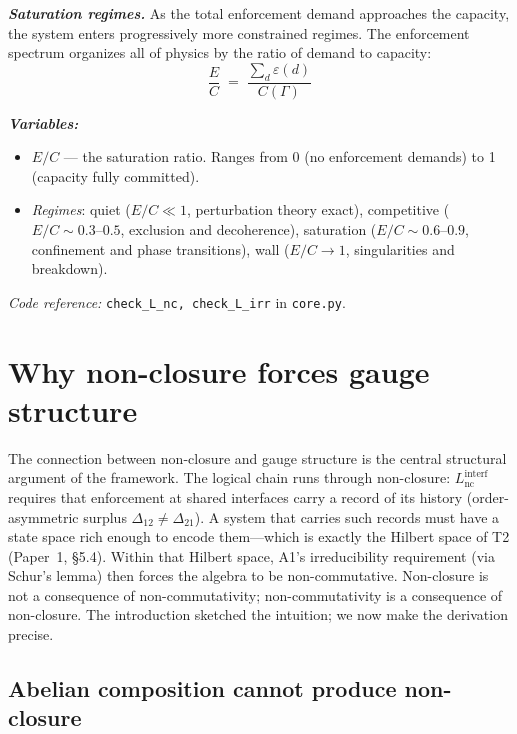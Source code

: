 \documentclass[11pt]{article}
\newenvironment{varlist}{\begin{itemize}[nosep,leftmargin=2em]}{\end{itemize}}
\newcommand{\coderef}[2]{\smallskip\noindent\textit{Code reference:} \texttt{#1} in \texttt{#2}.}
\begin{document}
\begin{tcolorbox}[apfbox, title={Consequences of $L_{\mathrm{nc}}^{\mathrm{interf}}$: Superadditivity, Path Dependence, Saturation}]
\medskip
\textbf{\textit{Saturation regimes.}}  As the total enforcement demand approaches the capacity, the system enters progressively more constrained regimes.  The enforcement spectrum organizes all of physics by the ratio of demand to capacity:
\begin{equation}
\frac{E}{C} \;=\; \frac{\sum_d \varepsilon(d)}{C(\Gamma)}
\label{eq:saturation_ratio}
\end{equation}

\smallskip\noindent\textbf{\textit{Variables:}}
\begin{varlist}
\item $E/C$ --- the saturation ratio.  Ranges from 0 (no enforcement demands) to 1 (capacity fully committed).
\item \textit{Regimes}: quiet ($E/C \ll 1$, perturbation theory exact), competitive ($E/C \sim 0.3$--$0.5$, exclusion and decoherence), saturation ($E/C \sim 0.6$--$0.9$, confinement and phase transitions), wall ($E/C \to 1$, singularities and breakdown).
\end{varlist}

\coderef{check\_L\_nc, check\_L\_irr}{core.py}
\end{tcolorbox}


\section{Why non-closure forces gauge structure}
\label{sec:gauge_origin}

The connection between non-closure and gauge structure is the central structural argument of the framework.  The logical chain runs through non-closure: $L_{\mathrm{nc}}^{\mathrm{interf}}$ requires that enforcement at shared interfaces carry a record of its history (order-asymmetric surplus $\Delta_{12} \ne \Delta_{21}$).  A system that carries such records must have a state space rich enough to encode them---which is exactly the Hilbert space of T2 (Paper~1, \S5.4).  Within that Hilbert space, A1's irreducibility requirement (via Schur's lemma) then forces the algebra to be non-commutative.  Non-closure is not a consequence of non-commutativity; non-commutativity is a consequence of non-closure.  The introduction sketched the intuition; we now make the derivation precise.

\subsection{Abelian composition cannot produce non-closure}
\end{document}

